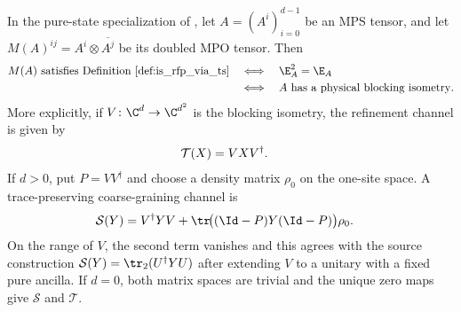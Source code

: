 \begin{lemma}
    \label{thm:pure_doubled_tensor_rfp_via_ts}
    \leanok
    In the pure-state specialization of
    \cite[lines~668, 675--687]{Cirac2016MPDO_arXiv}, let
    $A=(A^i)_{i=0}^{d-1}$ be an MPS tensor, and let
    $M(A)^{ij}=A^i\otimes\overline{A^j}$ be its doubled MPO tensor. Then
    \begin{align}
        M(A)\text{ satisfies Definition~\ref{def:is_rfp_via_ts}}
         & \quad\Longleftrightarrow\quad \E_A^2=\E_A
        \notag                                       \\
         & \quad\Longleftrightarrow\quad
        A\text{ has a physical blocking isometry}.
        \notag
    \end{align}
    More explicitly, if $V\colon\C^d\to\C^{d^2}$ is the blocking isometry,
    the refinement channel is given by
    \begin{align}
        \mathcal T(X) & =VXV^\dagger.
        \notag
    \end{align}
    If $d>0$, put $P=VV^\dagger$ and choose a density matrix $\rho_0$ on the
    one-site space. A trace-preserving coarse-graining channel is
    \begin{align}
        \mathcal S(Y)
         & =V^\dagger YV
        +\tr\!\bigl((\Id-P)Y(\Id-P)\bigr)\rho_0.
        \notag
    \end{align}
    On the range of $V$, the second term vanishes and this agrees with the
    source construction
    $\mathcal S(Y)=\tr_2(U^\dagger YU)$ after extending $V$ to a unitary with
    a fixed pure ancilla. If $d=0$, both matrix spaces are trivial and the
    unique zero maps give $\mathcal S$ and $\mathcal T$.
\end{lemma}
